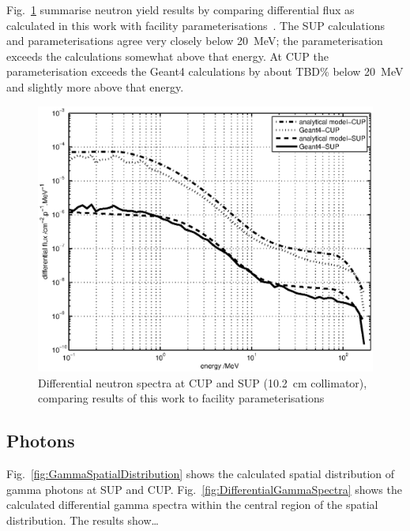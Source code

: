 \documentclass[11pt,a4paper]{IEEEtran}
\let\MYoriglatexcaption\caption
\renewcommand{\caption}[2][\relax]{\MYoriglatexcaption[#2]{#2}}
\begin{document}
Fig.~\ref{fig:DifferentialSpectra} summarise neutron yield results by comparing differential flux as calculated in this work with facility parameterisations~\cite{Prokofiev2009,Prokofiev14}.
The SUP calculations and parameterisations agree very closely below \SI{20}{\MeV}; the parameterisation exceeds the calculations somewhat above that energy.
At CUP the parameterisation exceeds the Geant4 calculations by about TBD\% below \SI{20}{\MeV} and slightly more above that energy.

\begin{figure}[t]
    \centering
    \includegraphics[width=0.9\columnwidth]{DiffYieldComparedSUPCUP10.eps}
    \caption{
        Differential neutron spectra at CUP and SUP (\SI{10.2}{\cm} collimator), comparing results of this work to facility parameterisations~\cite{Prokofiev2009,Prokofiev14}
    }
    \label{fig:DifferentialSpectra}
\end{figure}




\subsection{Photons}
Fig.~\ref{fig:GammaSpatialDistribution} shows the calculated spatial distribution of gamma photons at SUP and CUP.
Fig.~\ref{fig:DifferentialGammaSpectra} shows the calculated differential gamma spectra within the central region of the spatial distribution.
The results show\ldots
{}
\end{document}
